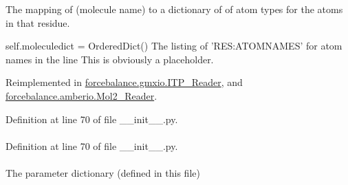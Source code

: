 \-The mapping of (molecule name) to a dictionary of of atom types for the atoms in that residue. 

self.\-moleculedict = \-Ordered\-Dict() \-The listing of '\-R\-E\-S\-:\-A\-T\-O\-M\-N\-A\-M\-E\-S' for atom names in the line \-This is obviously a placeholder. 

\-Reimplemented in \hyperlink{classforcebalance_1_1gmxio_1_1ITP__Reader_a5ed800499e9442adaea0cee243960f94}{forcebalance.\-gmxio.\-I\-T\-P\-\_\-\-Reader}, and \hyperlink{classforcebalance_1_1amberio_1_1Mol2__Reader_acdeaabdae39b208fb9430ee4cd6de113}{forcebalance.\-amberio.\-Mol2\-\_\-\-Reader}.



\-Definition at line 70 of file \-\_\-\-\_\-init\-\_\-\-\_\-.\-py.

\hypertarget{classforcebalance_1_1BaseReader_a4369b5fb663a83b11602daa71db6862e}{
\paragraph[{\-Molecules}]{}}\label{classforcebalance_1_1BaseReader_a4369b5fb663a83b11602daa71db6862e}


\-Definition at line 70 of file \-\_\-\-\_\-init\-\_\-\-\_\-.\-py.

\hypertarget{classforcebalance_1_1tinkerio_1_1Tinker__Reader_aa4b51a0bac226e11fa0a2a0e80d77394}{
\paragraph[{pdict}]{}}\label{classforcebalance_1_1tinkerio_1_1Tinker__Reader_aa4b51a0bac226e11fa0a2a0e80d77394}


\-The parameter dictionary (defined in this file) 



